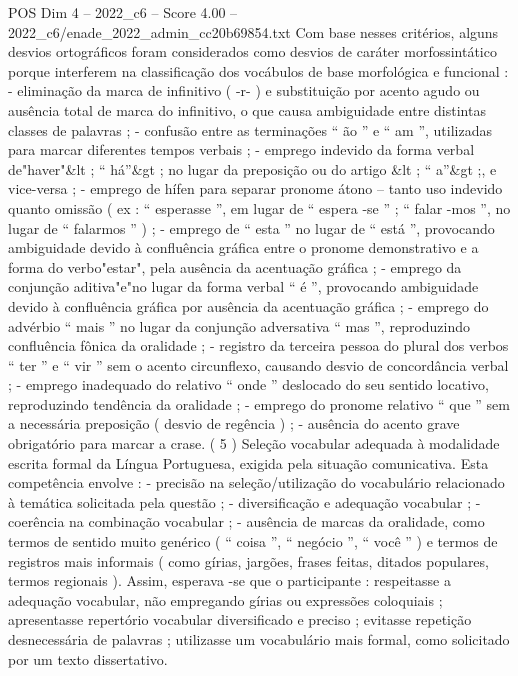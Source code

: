 \begin{textsample}{POS Dim 4 – 2022\_c6 – Score 4.00 – 2022\_c6/enade\_2022\_admin\_cc20b69854.txt}
Com base nesses critérios, alguns desvios ortográficos foram considerados como desvios de caráter morfossintático porque interferem na classificação dos vocábulos de base morfológica e funcional : - eliminação da marca de infinitivo ( -r- ) e substituição por acento agudo ou ausência total de marca do infinitivo, o que causa ambiguidade entre distintas classes de palavras ; - confusão entre as terminações “ ão ” e “ am ”, utilizadas para marcar diferentes tempos verbais ; - emprego indevido da forma verbal de"haver"\&lt ; “ há”\&gt ; no lugar da preposição ou do artigo \&lt ; “ a”\&gt ;, e vice-versa ; - emprego de hífen para separar pronome átono – tanto uso indevido quanto omissão ( ex : “ esperasse ”, em lugar de “ espera -se ” ; “ falar -mos ”, no lugar de “ falarmos ” ) ; - emprego de “ esta ” no lugar de “ está ”, provocando ambiguidade devido à confluência gráfica entre o pronome demonstrativo e a forma do verbo"estar", pela ausência da acentuação gráfica ; - emprego da conjunção aditiva"e"no lugar da forma verbal “ é ”, provocando ambiguidade devido à confluência gráfica por ausência da acentuação gráfica ; - emprego do advérbio “ mais ” no lugar da conjunção adversativa “ mas ”, reproduzindo confluência fônica da oralidade ; - registro da terceira pessoa do plural dos verbos “ ter ” e “ vir ” sem o acento circunflexo, causando desvio de concordância verbal ; - emprego inadequado do relativo “ onde ” deslocado do seu sentido locativo, reproduzindo tendência da oralidade ; - emprego do pronome relativo “ que ” sem a necessária preposição ( desvio de regência ) ; - ausência do acento grave obrigatório para marcar a crase. ( 5 ) Seleção vocabular adequada à modalidade escrita formal da Língua Portuguesa, exigida pela situação comunicativa.
Esta competência envolve : - precisão na seleção/utilização do vocabulário relacionado à temática solicitada pela questão ; - diversificação e adequação vocabular ; - coerência na combinação vocabular ; - ausência de marcas da oralidade, como termos de sentido muito genérico ( “ coisa ”, “ negócio ”, “ você ” ) e termos de registros mais informais ( como gírias, jargões, frases feitas, ditados populares, termos regionais ).
Assim, esperava -se que o participante : respeitasse a adequação vocabular, não empregando gírias ou expressões coloquiais ; apresentasse repertório vocabular diversificado e preciso ; evitasse repetição desnecessária de palavras ; utilizasse um vocabulário mais formal, como solicitado por um texto dissertativo.

\end{textsample}
